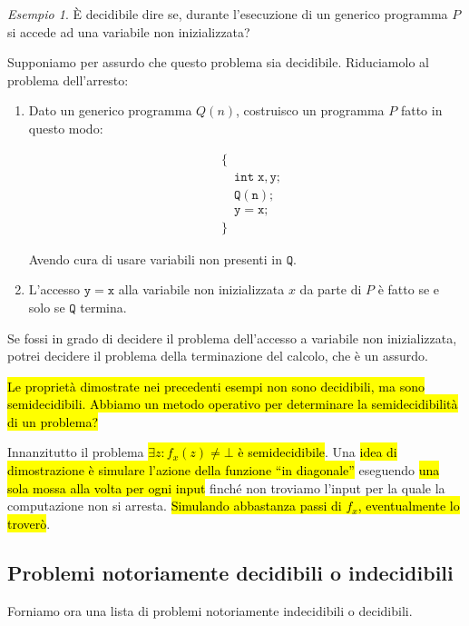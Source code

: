 \documentclass[a4paper,11pt,twoside]{article}
\theoremstyle{plain}
\theoremstyle{definition}
\theoremstyle{remark}
\newtheorem{esempio}{Esempio}[section]
\begin{document}
\begin{esempio}
  È decidibile dire se, durante l'esecuzione di un generico programma $P$ si
  accede ad una variabile non inizializzata?

  Supponiamo per assurdo che questo problema sia decidibile. Riduciamolo al
  problema dell'arresto:

  \begin{enumerate}
    \item Dato un generico programma $Q(n)$, costruisco un programma $P$ fatto
      in questo modo:

      \begin{align*}
        & \{ \\
        & \quad \mathtt{int \; x,y;} \\
        & \quad \mathtt{Q(n);} \\
        & \quad \mathtt{y=x;} \\
        & \}
      \end{align*}

      Avendo cura di usare variabili non presenti in $\mathtt{Q}$.
    \item L'accesso $\mathtt{y=x}$ alla variabile non inizializzata $x$ da parte
      di $P$ è fatto se e solo se $\mathtt{Q}$ termina.
  \end{enumerate}

  Se fossi in grado di decidere il problema dell'accesso a variabile non
  inizializzata, potrei decidere il problema della terminazione del calcolo, che
  è un assurdo.
\end{esempio}

\hl{Le proprietà dimostrate nei precedenti esempi non sono decidibili, ma sono
semidecidibili. Abbiamo un metodo operativo per determinare la semidecidibilità
di un problema?}

Innanzitutto il problema \hl{$\exists z : f_x(z) \neq \bot$ è semidecidibile}.
Una \hl{idea di dimostrazione è simulare l'azione della funzione ``in
diagonale''} eseguendo \hl{una sola mossa alla volta per ogni input} finché non
troviamo l'input per la quale la computazione non si arresta. \hl{Simulando
abbastanza passi di $f_x$, eventualmente lo troverò}.

\subsection{Problemi notoriamente decidibili o indecidibili}\label{sec:dec-indec-noti}

Forniamo ora una lista di problemi notoriamente indecidibili o decidibili.
\end{document}
